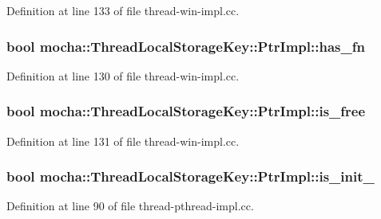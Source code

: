 Definition at line 133 of file thread-\/win-\/impl.cc.

\hypertarget{classmocha_1_1_thread_local_storage_key_1_1_ptr_impl_aeb62366cc391935b763c26bfa31a1fac}{
\subsubsection[{has\_\-fn}]{\setlength{\rightskip}{0pt plus 5cm}bool {\bf mocha::ThreadLocalStorageKey::PtrImpl::has\_\-fn}}}
\label{classmocha_1_1_thread_local_storage_key_1_1_ptr_impl_aeb62366cc391935b763c26bfa31a1fac}


Definition at line 130 of file thread-\/win-\/impl.cc.

\hypertarget{classmocha_1_1_thread_local_storage_key_1_1_ptr_impl_a77edafba95efc89b7406d8ae80153fe0}{
\subsubsection[{is\_\-free}]{\setlength{\rightskip}{0pt plus 5cm}bool {\bf mocha::ThreadLocalStorageKey::PtrImpl::is\_\-free}}}
\label{classmocha_1_1_thread_local_storage_key_1_1_ptr_impl_a77edafba95efc89b7406d8ae80153fe0}


Definition at line 131 of file thread-\/win-\/impl.cc.

\hypertarget{classmocha_1_1_thread_local_storage_key_1_1_ptr_impl_a1acc401222610dd2f0de7c26428e8e5a}{
\subsubsection[{is\_\-init\_\-}]{\setlength{\rightskip}{0pt plus 5cm}bool {\bf mocha::ThreadLocalStorageKey::PtrImpl::is\_\-init\_\-}}}
\label{classmocha_1_1_thread_local_storage_key_1_1_ptr_impl_a1acc401222610dd2f0de7c26428e8e5a}


Definition at line 90 of file thread-\/pthread-\/impl.cc.

